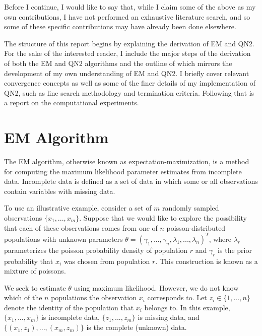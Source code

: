 \documentclass[letter,12pt]{article}
\begin{document}
Before I continue, I would like to say that, while I claim some of the above as my own contributions, I have not performed an exhaustive literature search, and so some of these specific contributions may have already been done elsewhere.  

The structure of this report begins by explaining the derivation of EM and QN2.  For the sake of the interested reader, I include the major steps of the derivation of both the EM and QN2 algorithms and the outline of which mirrors the development of my own understanding of EM and QN2.  I briefly cover relevant convergence concepts as well as some of the finer details of my implementation of QN2, such as line search methodology and termination criteria.  Following that is a report on the computational experiments.

\section{EM Algorithm}

The EM algorithm, otherwise known as expectation-maximization, is a method for computing the maximum likelihood parameter estimates from incomplete data.  Incomplete data is defined as a set of data in which some or all observations contain variables with missing data.  

To use an illustrative example, consider a set of $m$ randomly sampled observations $\{x_1,...,x_m\}$.  Suppose that we would like to explore the possibility that each of these observations comes from one of $n$ poisson-distributed populations with unknown parameters $\theta=(\gamma_1,...,\gamma_n,\lambda_1,...,\lambda_n)^T$, where $\lambda_r$ parameterizes the poisson probability density of population $r$ and $\gamma_r$ is the prior probability that $x_i$ was chosen from population $r$.  This construction is known as a mixture of poissons.

We seek to estimate $\theta$ using maximum likelihood.  However, we do not know which of the $n$ populations the observation $x_i$ corresponds to.  Let $z_i \in \{1,...,n\}$ denote the identity of the population that $x_i$ belongs to.  In this example, $\{x_1,...,x_m\}$ is incomplete data, $\{z_1,...,z_m\}$ is missing data, and $\{(x_1,z_1),...,(x_m,z_m)\}$ is the complete (unknown) data.
\end{document}
